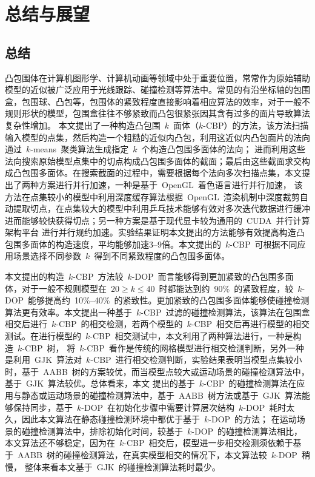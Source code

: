 

\chapter{总结与展望}
\label{cha:summery:futurework}
\section{总结}
\label{sec:summery}

凸包围体在计算机图形学、计算机动画等领域中处于重要位置，常常作为原始辅助模型的近似被广泛应用于光线跟踪、碰撞检测等算法中。常见的有沿坐标轴的包围盒，包围球、凸包等，包围体的紧致程度直接影响着相应算法的效率，对于一般不规则形状的模型，包围盒往往不够紧致而凸包很紧张因其含有过多的面片导致算法复杂性增加。
本文提出了一种构造凸包围~$k$~面体（$k$-CBP）的方法，该方法扫描输入模型的点集，然后构造一个粗糙的近似内凸包，利用这近似内凸包面片的法向通过~$k$-means~聚类算法生成指定~$k$~个构造凸包围多面体的法向；
进而利用这些法向搜索原始模型点集中的切点构成凸包围多面体的截面；最后由这些截面求交构成凸包围多面体。在搜索截面的过程中，需要根据每个法向多次扫描点集，本文提出了两种方案进行并行加速，一种是基于~OpenGL~着色语言进行并行加速，
该方法在点集较小的模型中利用深度缓存算法根据~OpenGL~渲染机制中深度裁剪自动提取切点，在点集较大的模型中利用乒乓技术能够有效对多次迭代数据进行缓冲进而能够较快获得切点；另一种方案是基于现代显卡较为通用的~CUDA~并行计算架构平台
进行并行规约加速。实验结果证明本文提出的方法能够有效提高构造凸包围多面体的构造速度，平均能够加速3--9倍。本文提出的~$k$-CBP~可根据不同应用场景选择不同参数~$k$~得到不同紧致程度的凸包围多面体。

本文提出的构造~$k$-CBP~方法较~$k$-DOP~而言能够得到更加紧致的凸包围多面体，对于一般不规则模型在~$20 \geq k \leq 40 $~时都能达到约~90\%~的紧致程度，较~$k$-DOP~能够提高约~10\%--40\%~的紧致性。更加紧致的凸包围多面体能够使碰撞检测算法更有效率。本文提出一种基于~$k$-CBP~过滤的碰撞检测算法，该算法在包围盒相交后进行~$k$-CBP~的相交检测，若两个模型的~$k$-CBP~相交后再进行模型的相交测试。在进行模型的~$k$-CBP~相交测试中，本文利用了两种算法进行，一种是构造~$k$-CBP~树，
将~$k$-CBP~看作是传统的网格模型进行相交检测判断，另外一种是利用~GJK~算法对~$k$-CBP~进行相交检测判断，实验结果表明当模型点集较小时，基于~AABB~树的方案较优，而当模型点较大或运动场景的碰撞检测算法中，基于~GJK~算法较优。总体看来，本文
提出的基于~$k$-CBP~的碰撞检测算法在应用与静态或运动场景的碰撞检测算法中，基于~AABB~树方法或基于~GJK~算法能够保持同步，基于~$k$-DOP~在初始化步骤中需要计算层次结构~$k$-DOP~耗时太久，因此本文算法在静态碰撞检测环境中都优于基于~$k$-DOP~的方法；
在运动场景的碰撞检测算法中，排除初始化时间，较基于~$k$-DOP~的碰撞检测算法相比，本文算法还不够稳定，因为在~$k$-CBP~相交后，模型进一步相交检测须依赖于基于~AABB~树的碰撞检测算法，在真实模型相交的情况下，本文算法较~$k$-DOP~稍慢，
整体来看本文基于~GJK~的碰撞检测算法耗时最少。


